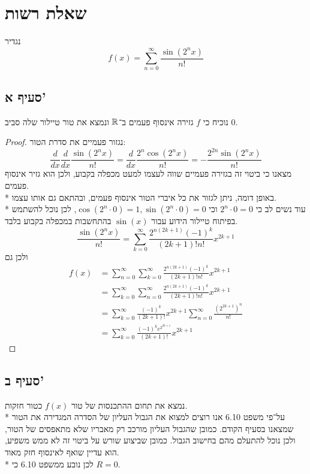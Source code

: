\section{שאלת רשות}
נגדיר
\[
	f(x) = \sum_{n = 0}^{\infty} \frac{\sin(2^n x)}{n!}
\]

\subsection{סעיף א'}
נוכיח כי $f$ גזירה אינסוף פעמים ב־$\mathbb{R}$ ונמצא את טור טיילור שלה סביב $0$.
\begin{proof}
	נגזור פעמיים את סדרת הטור:
	\[
		\frac{d}{dx} \frac{d}{dx} \frac{\sin(2^n x)}{n!}
		= \frac{d}{dx} \frac{2^n \cos(2^n x)}{n!}
		= -\frac{2^{2n} \sin(2^n x)}{n!}
	\]
	מצאנו כי ביטוי זה בגזירה פעמיים שווה לעצמו למעט מכפלה בקבוע, ולכן הוא גזיר אינסוף פעמים. \\*
	באופן דומה, ניתן לגזור את כל איברי הטור אינסוף פעמים, ובהתאם גם אותו עצמו. \\*
	עוד נשים לב כי $2^n \cdot 0 = 0$ וכי $\cos(2^n \cdot 0) = 1, \sin(2^n \cdot 0) = 0$,
	לכן נוכל להשתמש בפיתוח טיילור הידוע עבור $\sin(x)$ בהתחשבות במכפלה בקבוע בלבד.
	\[
		\frac{\sin(2^n x)}{n!}
		= \sum_{k = 0}^{\infty} \frac{2^{n(2k + 1)} {(-1)}^k}{(2k + 1)! n!} x^{2k + 1}
	\]
	ולכן גם
	\begin{align*}
		f(x)
		& = \sum_{n = 0}^{\infty} \sum_{k = 0}^{\infty} \frac{2^{n(2k+1)} {(-1)}^k}{(2k + 1)! n!} x^{2k + 1} \\
		& = \sum_{k = 0}^{\infty} \sum_{n = 0}^{\infty} \frac{2^{n(2k+1)} {(-1)}^k}{(2k + 1)! n!} x^{2k + 1} \\
		& = \sum_{k = 0}^{\infty} \frac{{(-1)}^k}{(2k + 1)!} x^{2k + 1} \sum_{n = 0}^{\infty} \frac{{(2^{2k+1})}^n}{n!} \\
		& = \sum_{k = 0}^{\infty} \frac{{(-1)}^k e^{2^{2k+1}}}{(2k + 1)!} x^{2k + 1}
	\end{align*}
\end{proof}

\subsection{סעיף ב'}
נמצא את תחום ההתכנסות של טור $f(x)$ כטור חזקות. \\*
על־פי משפט 6.10 אנו רוצים למצוא את הגבול העליון של הסדרה המגדירה את הטור שמצאנו בסעיף הקודם.
כמובן שהגבול העליון מורכב רק מאבריו שלא מתאפסים של הטור, ולכן נוכל להתעלם מהם בחישוב הגבול.
כמובן שביצוע שורש על ביטוי זה לא ממש משפיע, הוא עדיין שואף לאינסוף חזק מאוד. \\*
לכן נובע ממשפט 6.10 כי $R = 0$.

